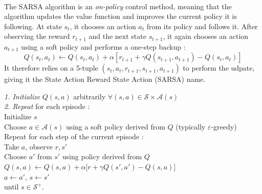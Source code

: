 \documentclass[a4paper]{report}
\begin{document}
{{{				\paragraph{} The SARSA algorithm is an \emph{on-policy} control method, meaning that the algorithm updates the value function and improves the current policy it is following. At state $s_t$, it chooses an action $a_t$ from its policy and follows it. After observing the reward $r_{t+1}$ and the next state $s_{t+1}$, it again chooses an action $a_{t+1}$ using a soft policy and performs a one-step backup : 
				\begin{equation}
					Q(s_t,a_t) \leftarrow Q(s_t,a_t) + \alpha\left[r_{t+1} + \gamma Q(s_{t+1},a_{t+1}) - Q(s_t,a_t)\right]
				\end{equation}
				It therefore relies on a 5-tuple $(s_t,a_t,r_{t+1},s_{t+1},a_{t+1})$ to perform the udpate, giving it the State Action Reward State Action (SARSA) name. 
				\vspace{10pt}
				
					{
						\begin{algorithm}[H]
	 					\SetAlgoLined
						\LinesNumbered
						\emph{\textsf{1. Initialize}} $Q(s,a)$ arbitrarily $\forall (s,a)\in\mathcal{S}\times\mathcal{A}(s)$ \\
						\BlankLine
						\BlankLine
						\emph{\textsf{2. Repeat}} for each episode : \\
						\Indp \Indp 
							Initialize $s$ \\
							Choose $a\in\mathcal{A}(s)$ using a soft policy derived from $Q$ (typically $\varepsilon$-greedy) \\
							Repeat for each step of the current episode :   \\
							\Indp \Indp 
								Take $a$, observe $r,s'$ \\
								Choose $a'$ from $s'$ using policy derived from $Q$ 
								$ Q(s,a) \longleftarrow Q(s,a) + \alpha\big[ r + \gamma Q(s',a') - Q(s,a) \big]$ \\
								$a\leftarrow a'$, $s\leftarrow s' $ \\
								
							\Indm \Indm 
						until $s\in\mathcal{S}^+$.
						\Indm \Indm 
						\end{algorithm}
					}
					
}}}
\end{document}
